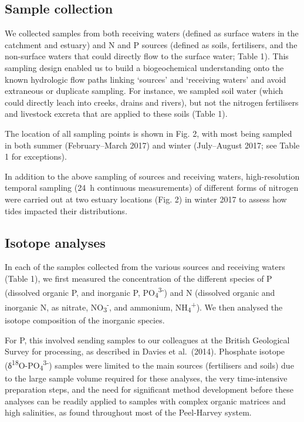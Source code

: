 \documentclass[
]{book}
\begin{document}
\hypertarget{sample-collection-1}{%
\subsection{Sample collection}\label{sample-collection-1}}

We collected samples from both receiving waters (defined as surface waters in the catchment and estuary) and N and P sources (defined as soils, fertilisers, and the non-surface waters that could directly flow to the surface water; Table 1). This sampling design enabled us to build a biogeochemical understanding onto the known hydrologic flow paths linking `sources' and `receiving waters' and avoid extraneous or duplicate sampling. For instance, we sampled soil water (which could directly leach into creeks, drains and rivers), but not the nitrogen fertilisers and livestock excreta that are applied to these soils (Table 1).

The location of all sampling points is shown in Fig. 2, with most being sampled in both summer (February--March 2017) and winter (July--August 2017; see Table 1 for exceptions).

In addition to the above sampling of sources and receiving waters, high-resolution temporal sampling (24~h continuous measurements) of different forms of nitrogen were carried out at two estuary locations (Fig. 2) in winter 2017 to assess how tides impacted their distributions.~

\hypertarget{isotope-analyses}{%
\subsection{Isotope analyses}\label{isotope-analyses}}

In each of the samples collected from the various sources and receiving waters (Table 1), we first measured the concentration of the different species of P (dissolved organic P, and inorganic P, PO\textsubscript{4}\textsuperscript{3-}) and N (dissolved organic and inorganic N, as nitrate, NO\textsubscript{3}\textsuperscript{-}, and ammonium, NH\textsubscript{4}\textsuperscript{+}). We then analysed the isotope composition of the inorganic species.~

For P, this involved sending samples to our colleagues at the British Geological Survey for processing, as described in Davies et al.~(2014). Phosphate isotope (δ\textsuperscript{18}O-PO\textsubscript{4}\textsuperscript{3-}) samples were limited to the main sources (fertilisers and soils) due to the large sample volume required for these analyses, the very time-intensive preparation steps, and the need for significant method development before these analyses can be readily applied to samples with complex organic matrices and high salinities, as found throughout most of the Peel-Harvey system.~
\end{document}
